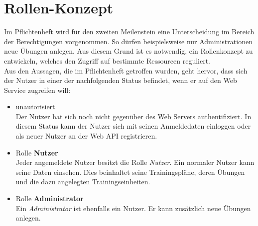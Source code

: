 \section{Rollen-Konzept}
\label{sec:rollen-konzept}
Im Pflichtenheft wird für den zweiten Meilenstein eine Unterscheidung im Bereich der Berechtigungen vorgenommen. So dürfen beispielsweise nur Administrationen neue Übungen anlegen. Aus diesem Grund ist es notwendig, ein Rollenkonzept zu entwickeln, welches den Zugriff auf bestimmte Ressourcen reguliert. \\
Aus den Aussagen, die im Pflichtenheft getroffen wurden, geht hervor, dass sich der Nutzer in einer der nachfolgenden Status befindet, wenn er auf den Web Service zugreifen will: 
\begin{itemize}
\item unautorisiert \\
Der Nutzer hat sich noch nicht gegenüber des Web Servers authentifiziert. In diesem Status kann der Nutzer sich mit seinen Anmeldedaten einloggen oder als neuer Nutzer an der Web \ac{API} registrieren.
\item Rolle \textbf{Nutzer}\\
Jeder angemeldete Nutzer besitzt die Rolle \textit{Nutzer}. Ein normaler Nutzer kann seine Daten einsehen. Dies beinhaltet seine Trainingspläne, deren Übungen und die dazu angelegten Trainingseinheiten.
\item Rolle \textbf{Administrator}\\
Ein \textit{Administrator} ist ebenfalls ein Nutzer. Er kann zusätzlich neue Übungen anlegen. 
\end{itemize}